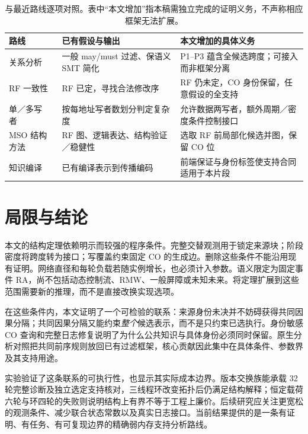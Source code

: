 \begin{table}[tb]
\caption{与最近路线逐项对照。表中“本文增加”指本稿需独立完成的证明义务，不声称相应框架无法扩展。}\label{tab:related}
\small\begin{tabularx}{\textwidth}{p{2.4cm}Y Y}\toprule
路线 & 已有假设与输出 & 本文增加的具体义务\\\midrule
关系分析~\cite{haas2023} & 一般 may/must 过滤、保语义 SMT 简化 & P1--P3 蕴含全候选跨度；可接入而非框架分离\\
RF 一致性~\cite{tunc2023} & RF 已定，寻找合法修改序 & RF 仍未定，CO 身份保留，任意假设的全支持\\
单／多写者~\cite{govind2026} & 按每地址写者数划分判定复杂度 & 允许数据两写者，额外周期／密度条件控制接口\\
MSO 结构方法~\cite{conrado2026} & RF 图、逻辑表达、结构验证／稳健性 & 选取 RF 前局部化候选并图，保留 CO 位\\
知识编译~\cite{kucera2021} & 已有编译表示到传播编码 & 前端保证与身份标签使支持合同适用于本片段\\\bottomrule
\end{tabularx}
\end{table}

\section{局限与结论}\label{sec:conclusion}
本文的结构定理依赖明示而较强的程序条件。完整交替观测用于锁定来源块；阶段密度将跨度转为接口；写覆盖约束固定 CO 的生成边。删除这些条件不能沿用现有证明。网络直径和每轮负载若随实例增长，也必须计入参数。语义限定为固定事件 RA，尚不包括动态控制流、RMW、一般屏障或未知未来。将定理扩展到这些范围需要新的推理，而不是直接改换实现选项。

在这些条件内，本文证明了一个可检验的联系：来源身份未决并不妨碍获得共同因果分隔；共同因果分隔又能约束\emph{整个}候选表示，而不是只约束已选执行。身份敏感 CO 查询和完整日志修复说明了为什么公共知识与具体身份必须同时保留。原生分析对照把共同前序规则放回已有过滤框架，核心贡献因此集中在具体条件、参数界及其支持用途。

实验验证了这条联系的可执行性，也显示其实际成本边界。版本交换族能承载 32 轮完整诊断及独立选定支持核对，三线程环改变拓扑后仍满足结构解释；恒定载荷六轮与环四轮的失败则说明结构上有界不等于工程上廉价。后续研究应关注更宽松的观测条件、减少联合状态常数以及真实日志接口。当前结果提供的是一条有证明、有任务、有可复现边界的精确弱内存支持分析路线。
